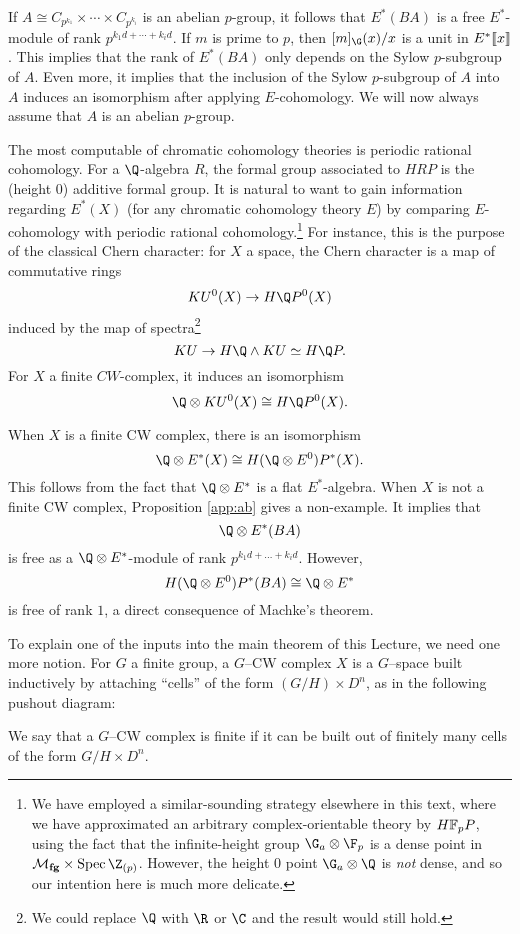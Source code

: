 If \(A \cong C_{p^{k_1}} \times \cdots \times C_{p^{k_i}}\) is an abelian \(p\)-group, it follows that \(E^*(BA)\) is a free \(E^*\)-module of rank \(p^{k_1d+\cdots + k_id}\). If \(m\) is prime to \(p\), then \([m]_{\G}(x)/x\) is a unit in \(E^*\llbracket{x}\rrbracket\). This implies that the rank of \(E^*(BA)\) only depends on the Sylow \(p\)-subgroup of \(A\). Even more, it implies that the inclusion of the Sylow \(p\)-subgroup of \(A\) into \(A\) induces an isomorphism after applying $E$-cohomology. We will now always assume that \(A\) is an abelian \(p\)-group.

The most computable of chromatic cohomology theories is periodic rational cohomology. For a \(\Q\)-algebra \(R\), the formal group associated to \(HRP\) is the (height \(0\)) additive formal group. It is natural to want to gain information regarding \(E^*(X)\) (for any chromatic cohomology theory \(E\)) by comparing \(E\)-cohomology with periodic rational cohomology.\footnote{We have employed a similar-sounding strategy elsewhere in this text, where we have approximated an arbitrary complex-orientable theory by \(\HFp P\), using the fact that the infinite-height group \(\G_a \otimes \F_p\) is a dense point in \(\moduli{fg} \times \Spec \Z_{(p)}\).  However, the height \(0\) point \(\G_a \otimes \Q\) is \emph{not} dense, and so our intention here is much more delicate.}  For instance, this is the purpose of the classical Chern character: for \(X\) a space, the Chern character is a map of commutative rings
\[
KU^0(X) \to H\Q P^0(X)
\] 
induced by the map of spectra\footnote{We could replace \(\Q\) with \(\R\) or \(\C\) and the result would still hold.} \[KU \to H\Q \wedge KU \simeq H\Q P.\] For \(X\) a finite \(CW\)-complex, it induces an isomorphism
\[
\Q \otimes KU^0(X) \cong H\Q P^0(X).
\]

When \(X\) is a finite CW complex, there is an isomorphism
\begin{equation*}
\Q \otimes E^*(X) \cong H(\Q \otimes E^0)P^*(X).
\end{equation*}
This follows from the fact that \(\Q \otimes E^*\) is a flat \(E^*\)-algebra. When \(X\) is not a finite CW complex, Proposition \ref{app:ab} gives a non-example. It implies that
\[
\Q \otimes E^*(BA)
\]
is free as a \(\Q \otimes E^*\)-module of rank \(p^{k_1d + \ldots + k_id}\). However, \[H(\Q \otimes E^0)P^*(BA) \cong \Q \otimes E^*\] is free of rank \(1\), a direct consequence of Machke's theorem.

To explain one of the inputs into the main theorem of this Lecture, we need one more notion. For \(G\) a finite group, a \(G\)--CW complex \(X\) is a \(G\)--space built inductively by attaching ``cells'' of the form \((G/H) \times D^n\), as in the following pushout diagram:
\begin{center}
\end{center}
We say that a \(G\)--CW complex is finite if it can be built out of finitely many cells of the form \(G/H \times D^n\).

